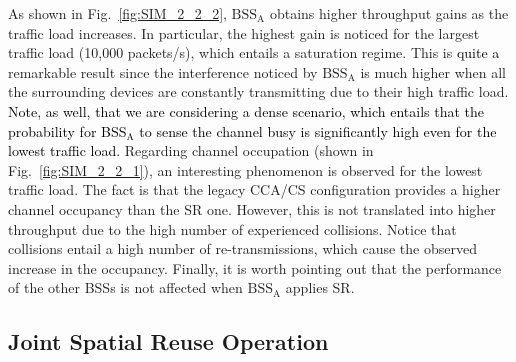 \documentclass{ieeeaccess}
\begin{document}
As shown in Fig.~\ref{fig:SIM_2_2_2}, $\text{BSS}_\text{A}$ obtains higher throughput gains as the traffic load increases. In particular, the highest gain is noticed for the largest traffic load (10,000 packets/s), which entails a saturation regime. This is \textcolor{black}{quite a} remarkable result since the interference noticed by $\text{BSS}_\text{A}$ is much higher when all the surrounding devices are constantly transmitting due to their high traffic load. \textcolor{black}{Note, as well, that we are considering a dense scenario, which entails that the probability for BSS$_\text{A}$ to sense the channel busy is significantly high even for the lowest traffic load.} Regarding channel occupation (shown in Fig.~\ref{fig:SIM_2_2_1}), an interesting phenomenon is observed for the lowest traffic load. The fact is that the legacy CCA/CS configuration provides a higher channel occupancy than the SR one. However, this is not translated into higher throughput due to the high number of experienced collisions. Notice that collisions entail a high number of re-transmissions, which cause the observed increase in the occupancy. Finally, it is worth pointing out that the performance of the other BSSs is not affected when $\text{BSS}_\text{A}$ applies SR.

\subsection{Joint Spatial Reuse Operation}
\label{section:random_scenarios_collaborative}
\end{document}

